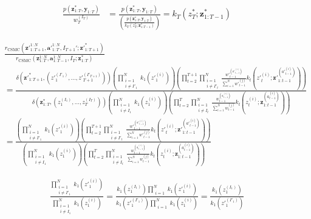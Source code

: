 \documentclass[11pt]{article}
\newcommand{\z}{\mathbf{z}}
\newcommand{\abold}{\mathbf{a}}
\newcommand{\y}{\mathbf{y}}
\begin{document}
\begin{align*}
\frac{p({\z}_{1:T}^*, \y_{1:T})}{{w}_{T}^{(I_{T})}}
    &= \frac{p({\z}_{1:T}^*, \y_{1:T})}
            {\left(\frac{p({\z}_{1:T}^*, \y_{1:T})}{k_{T}({z}_{T}^{*}; {\z}_{1:T-1}^{*})}\right)}
    = k_{T}({z}_{T}^{*}; {\z}_{1:T-1}^{*})
\end{align*}

\begin{align*}
& \frac{r_{\mathrm{CSMC}}({\z'}_{1:T+1}^{1:N}, {\abold'}_{1:T}^{1:N}, I_{T+1}'; {\z'}_{1:T+1}^*)}
{r_{\mathrm{CSMC}}(\z_{1:T}^{1:N}, \abold_{1:T-1}^{1:N}, I_T; \z_{1:T}^*)}\\
&= \frac{
\delta({\z'}_{1:T+1}^*,  ({z'}_1^{(I'_1)}, \ldots, {z'}_{T+1}^{(I'_{T+1})}))
        \left( \prod_{\substack{i=1\\i \ne I'_1}}^N k_1({z'}_1^{(i)}) \right)
        \left( \prod_{t=2}^{T+1} \prod_{\substack{i=1\\i \ne I'_t}}^N \frac{{w'}_{t-1}^{({a'}_{t-1}^{(i)})}}{\sum_{i=1}^N {w'}_{t-1}^{(j)}} k_t({z'}_t^{(i)}; {\z'}_{1:t-1}^{({a'}_{t-1}^{(i)})} )\right)
}
{
\delta(\z_{1:T}^*,  (z_1^{(I_1)}, \ldots, z_T^{(I_T)}))
        \left( \prod_{\substack{i=1\\i \ne I_1}}^N k_1(z_1^{(i)}) \right)
        \left( \prod_{t=2}^T \prod_{\substack{i=1\\i \ne I_t}}^N \frac{w_{t-1}^{(a_{t-1}^{(i)})}}{\sum_{i=1}^N w_{t-1}^{(j)}} k_t(z_t^{(i)}; \z_{1:t-1}^{(a_{t-1}^{(i)})} )\right)
}\\
&= \frac{
        \left( \prod_{\substack{i=1\\i \ne I'_1}}^N k_1({z'}_1^{(i)}) \right)
        \left( \prod_{t=2}^{T+1} \prod_{\substack{i=1\\i \ne I'_t}}^N \frac{{w'}_{t-1}^{({a'}_{t-1}^{(i)})}}{\sum_{i=1}^N {w'}_{t-1}^{(j)}} k_t({z'}_t^{(i)}; {\z'}_{1:t-1}^{({a'}_{t-1}^{(i)})} )\right)
}{
        \left( \prod_{\substack{i=1\\i \ne I_1}}^N k_1(z_1^{(i)}) \right)
        \left( \prod_{t=2}^T \prod_{\substack{i=1\\i \ne I_t}}^N \frac{w_{t-1}^{(a_{t-1}^{(i)})}}{\sum_{i=1}^N w_{t-1}^{(j)}} k_t(z_t^{(i)}; \z_{1:t-1}^{(a_{t-1}^{(i)})} )\right)
}
\end{align*}

\begin{align*}
\frac{
    \prod_{\substack{i=1\\i \ne I'_1}}^N k_1({z'}_1^{(i)})
}{
    \prod_{\substack{i=1\\i \ne I_1}}^N k_1(z_1^{(i)})
} =
\frac{
    k_1(z_1^{(I_1)}) \prod_{\substack{i=1}}^N k_1({z'}_1^{(i)})
}{
    k_1({z'}_1^{(I'_1)}) \prod_{\substack{i=1}}^N k_1(z_1^{(i)})
} =
\frac{
k_1(z_1^{(I_1)}) 
}{
k_1({z'}_1^{(I'_1)})
}
\end{align*}
\end{document}
